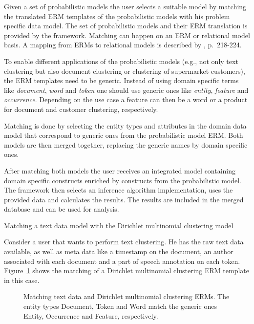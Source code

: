 Given a set of probabilistic models the user selects a suitable model by matching the translated ERM templates of the probabilistic models with his problem specific data model. The set of probabilistic models and their ERM translation is provided by the framework. Matching can happen on an ERM or relational model basis. A mapping from ERMs to relational models is described by \textcite{elmasri2007database}, p.~218-224.

To enable different applications of the probabilistic models (e.g., not only text clustering but also document clustering or clustering of supermarket customers), the ERM templates need to be generic. Instead of using domain specific terms like \emph{document}, \emph{word} and \emph{token} one should use generic ones like \emph{entity}, \emph{feature} and \emph{occurrence}. Depending on the use case a feature can then be a word or a product for document and customer clustering, respectively.

Matching is done by selecting the entity types and attributes in the domain data model that correspond to generic ones from the probabilistic model ERM. Both models are then merged together, replacing the generic names by domain specific ones.

After matching both models the user receives an integrated model containing domain specific constructs enriched by constructs from the probabilistic model. The framework then selects an inference algorithm implementation, uses the provided data and calculates the results. The results are included in the merged database and can be used for analysis.

\vspace*{-1em}

\begin{Example} Matching a text data model with the Dirichlet multinomial clustering model

Consider a user that wants to perform text clustering. He has the raw text data available, as well as meta data like a timestamp on the document, an author associated with each document and a part of speech annotation on each token. Figure~\ref{fig:matching_clustering} shows the matching of a Dirichlet multinomial clustering ERM template in this case.

\vspace*{1em}
\begin{figure}[h!]
\centering
\scalebox{0.5}{\adjustTikzSize }
\caption[Matching text data and Dirichlet multinomial clustering ERM]{Matching text data and Dirichlet multinomial clustering ERMs. The entity types Document, Token and Word match the generic ones Entity, Occurrence and Feature, respectively.}\label{fig:matching_clustering}
\end{figure}

\end{Example}
